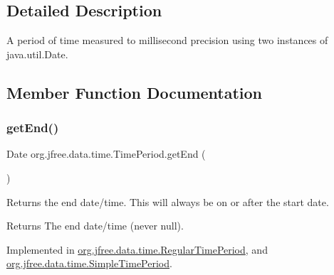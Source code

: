 \subsection{Detailed Description}
A period of time measured to millisecond precision using two instances of {\ttfamily java.\+util.\+Date}. 

\subsection{Member Function Documentation}
\mbox{\label{interfaceorg_1_1jfree_1_1data_1_1time_1_1_time_period_aa0fe39753e3af6252b98f5ff9f534f51}} 
\subsubsection{\texorpdfstring{get\+End()}{getEnd()}}
{\footnotesize\ttfamily Date org.\+jfree.\+data.\+time.\+Time\+Period.\+get\+End (\begin{DoxyParamCaption}{ }\end{DoxyParamCaption})}

Returns the end date/time. This will always be on or after the start date.

\begin{DoxyReturn}{Returns}
The end date/time (never {\ttfamily null}). 
\end{DoxyReturn}


Implemented in \mbox{\hyperlink{classorg_1_1jfree_1_1data_1_1time_1_1_regular_time_period_a90dca860a17fffbbacbe0d2ddeb721fe}{org.\+jfree.\+data.\+time.\+Regular\+Time\+Period}}, and \mbox{\hyperlink{classorg_1_1jfree_1_1data_1_1time_1_1_simple_time_period_afb5fba801200f718c01519eced7ed921}{org.\+jfree.\+data.\+time.\+Simple\+Time\+Period}}.

\mbox{\label{interfaceorg_1_1jfree_1_1data_1_1time_1_1_time_period_aa8f08870c3b6b95ee24064383521e72e}} 
